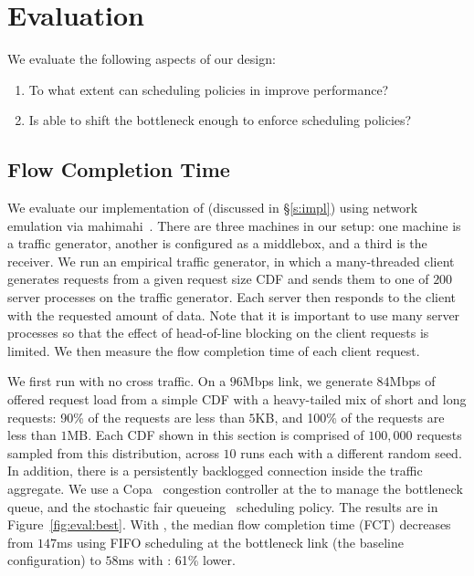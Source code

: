 \section{Evaluation}\label{s:eval}

We evaluate the following aspects of our design:
\begin{enumerate}
    \item To what extent can scheduling policies in \name improve performance?
    \item Is \name able to shift the bottleneck enough to enforce scheduling policies?
\end{enumerate}

\subsection{Flow Completion Time}\label{s:eval:fct}



We evaluate our implementation of \name (discussed in \S\ref{s:impl}) using network emulation via mahimahi~\cite{mahimahi}.
There are three machines in our setup: one machine is a traffic generator, another is configured as a middlebox, and a third is the receiver.
We run an empirical traffic generator, in which a many-threaded client generates requests from a given request size CDF and sends them to one of $200$ server processes on the traffic generator.
Each server then responds to the client with the requested amount of data.
Note that it is important to use many server processes so that the effect of head-of-line blocking on the client requests is limited.
We then measure the flow completion time of each client request.

We first run \name with no cross traffic.
On a $96$Mbps link, we generate $84$Mbps of offered request load from a simple CDF with a heavy-tailed mix of short and long requests: 90\% of the requests are less than $5$KB, and 100\% of the requests are less than $1$MB. 
Each CDF shown in this section is comprised of $100,000$ requests sampled from this distribution, across $10$ runs each with a different random seed.
In addition, there is a persistently backlogged connection inside the traffic aggregate.
We use a Copa~\cite{copa} congestion controller at the \inbox to manage the bottleneck queue, and the stochastic fair queueing~\cite{sfq} scheduling policy. 
The results are in Figure~\ref{fig:eval:best}.
With \name, the median flow completion time (FCT) decreases from $147$ms using FIFO scheduling at the bottleneck link (the baseline configuration) to $58$ms with \name: 61\% lower.

